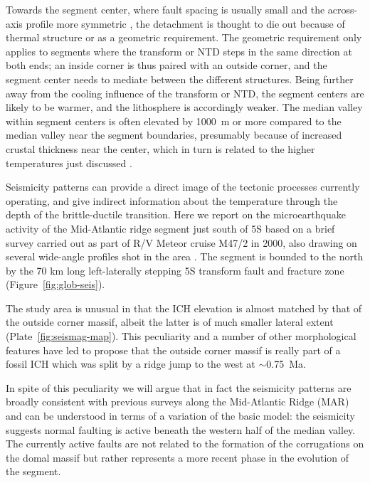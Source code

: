 \documentclass[aguplus]{aguplus}
\newlength{\tw}
\begin{document}
\begin{article}
Towards the segment center, where fault spacing is usually small and
the across-axis profile more symmetric \citep{shaw93}, the
detachment is thought to die out because of thermal structure or as a
geometric requirement.  The geometric requirement only applies to
segments where the transform or NTD steps in the same direction at
both ends; an inside corner is thus paired with an outside corner, and
the segment center needs to mediate between the different structures.
Being further away from the cooling influence of the transform or NTD,
the segment centers are likely to be warmer, and the lithosphere is
accordingly weaker.  The median valley within segment centers is often
elevated by 1000~m or more compared to the median valley near the
segment boundaries, presumably because of increased
crustal thickness near the center,
which in turn is related to the  higher temperatures just discussed
\citep[see e.g.,][]{neumann93}.

Seismicity patterns can provide a direct image of the tectonic
processes currently operating, and give indirect information about the
temperature through the depth of the brittle-ductile transition.
Here we report on the microearthquake activity of the Mid-Atlantic
ridge segment just south of 5\dg S based on a brief survey carried out
as part of R/V Meteor
cruise M47/2 in 2000, also drawing on several wide-angle profiles shot
in the area \citep{planert-con03}.
The segment is bounded to the north by the 70 km long left-laterally
stepping 5\dg S transform fault and fracture zone
(Figure~\ref{fig:glob-seis}).

 The study area is unusual in that the ICH elevation is almost matched
by that of the outside corner massif,
albeit the latter is of much smaller lateral extent
(Plate~\ref{fig:seismag-map}).  This peculiarity and a number of other
morphological features have led \citet{reston02} to propose that the
outside corner massif is really part of a fossil ICH which was split
by a ridge jump to the west at $\sim$0.75~Ma.

  In spite of
this peculiarity we will argue that in fact the seismicity patterns  are
broadly consistent with previous surveys along the Mid-Atlantic Ridge (MAR) and can be
understood in terms of a variation of the basic
\citet{tucholke94} model: the seismicity suggests normal
faulting is active beneath the western half of the median valley.
  The
currently active faults are
 not related to the formation of the corrugations on the
domal massif but rather represents a more recent phase in the evolution
of the segment.


\end{article}
\end{document}
